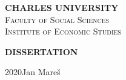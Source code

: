 \documentclass [a4paper,12pt]{report}
\def \BookName {DISSERTATION}
\def \AutorDP {Jan Mare\v{s}}
\def \Year {2020}
\def \CUNI {CHARLES UNIVERSITY}
\def \FSS {Faculty of Social Sciences}
\def \IES {Institute of Economic Studies}
\begin{document}
\pagestyle{empty}

    \begin{center}
    {\LARGE \textbf{\CUNI}}\\[2ex]
    {\LARGE \textsc{\FSS}}\\[1ex]
 	  {\large \textsc{\IES}}

		\vspace{8.47cm}
		
    {\Huge \textbf{\BookName} \\[4ex]

    }

    \vfill

    {\Large \Year \hfill \AutorDP}\\[6ex]

    \newpage
    \end{center}
\end{document}

